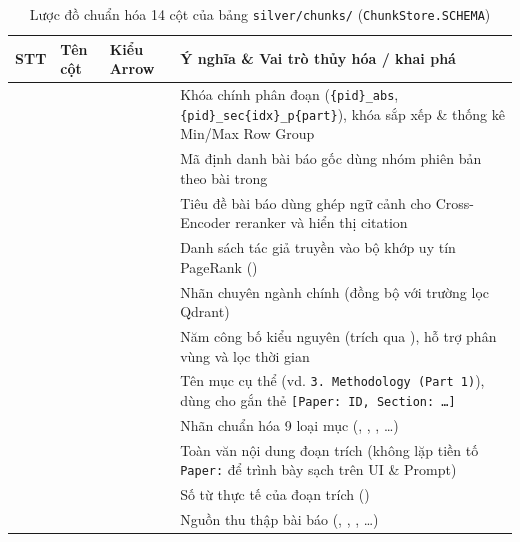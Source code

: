 \begin{table}[htbp]
  \centering
  \small
  \caption[Lược đồ 14 cột của bảng phân đoạn ChunkStore]{Lược đồ chuẩn hóa 14 cột của bảng \texttt{silver/chunks/} (\texttt{ChunkStore.SCHEMA})}
  \label{tab:chunkstore_schema}
  \setlength{\tabcolsep}{3.5pt}
  \begin{tabularx}{\linewidth}{|>{\centering\arraybackslash}p{8mm}|>{\raggedright\arraybackslash}p{28mm}|>{\raggedright\arraybackslash}p{24mm}|L|}
    \hline
    \textbf{STT} & \textbf{Tên cột} & \textbf{Kiểu Arrow} & \textbf{Ý nghĩa \& Vai trò thủy hóa / khai phá} \\
     &  &  & Khóa chính phân đoạn (\texttt{\{pid\}\_abs}, \texttt{\{pid\}\_sec\{idx\}\_p\{part\}}), khóa sắp xếp \& thống kê Min/Max Row Group \\
     &  &  & Mã định danh bài báo gốc dùng nhóm phiên bản theo bài trong  \\
     &  &  & Tiêu đề bài báo dùng ghép ngữ cảnh cho Cross-Encoder reranker và hiển thị citation \\
     &  &  & Danh sách tác giả truyền vào bộ khớp uy tín PageRank () \\
     &  &  & Nhãn chuyên ngành chính (đồng bộ với trường lọc Qdrant) \\
     &  &  & Năm công bố kiểu nguyên (trích qua ), hỗ trợ phân vùng và lọc thời gian \\
     &  &  & Tên mục cụ thể (vd. \texttt{3. Methodology (Part 1)}), dùng cho gắn thẻ \texttt{[Paper: ID, Section: \ldots]} \\
     &  &  & Nhãn chuẩn hóa 9 loại mục (, , , \ldots) \\
     &  &  & Toàn văn nội dung đoạn trích (không lặp tiền tố \texttt{Paper:} để trình bày sạch trên UI \& Prompt) \\
     &  &  & Số từ thực tế của đoạn trích () \\
     &  &  & Nguồn thu thập bài báo (, , , \ldots) \\

\end{tabularx}
\end{table}
